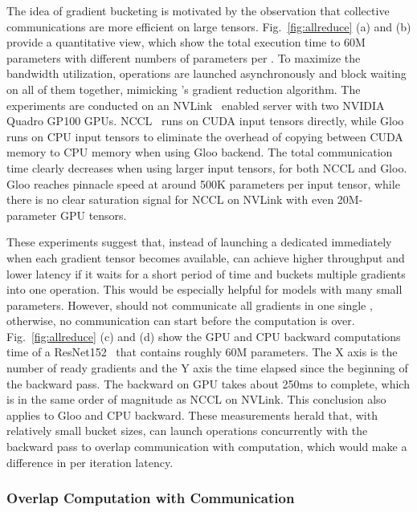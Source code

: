 The idea of gradient bucketing is motivated by the observation that collective communications are more efficient on large tensors. Fig.~\ref{fig:allreduce} (a) and (b) provide a quantitative view, which show the total execution time to  60M  parameters with different numbers of parameters per . To maximize the bandwidth utilization,  operations are launched asynchronously and block waiting on all of them together, mimicking 's gradient reduction algorithm. The experiments are conducted on an NVLink~\cite{nvlink} enabled server with two NVIDIA Quadro GP100 GPUs. NCCL~\cite{nccl}  runs on CUDA input tensors directly, while Gloo~\cite{gloo}  runs on CPU input tensors to eliminate the overhead of copying between CUDA memory to CPU memory when using Gloo backend. The total communication time clearly decreases when using larger input tensors, for both NCCL and Gloo. Gloo reaches pinnacle speed at around 500K parameters per input tensor, while there is no clear saturation signal for NCCL on NVLink with even 20M-parameter GPU tensors. 

These experiments suggest that, instead of launching a dedicated  immediately when each gradient tensor becomes available,  can achieve higher throughput and lower latency if it waits for a short period of time and buckets multiple gradients into one  operation. This would be especially helpful for models with many small parameters. However,  should not communicate all gradients in one single , otherwise, no communication can start before the computation is over. Fig.~\ref{fig:allreduce} (c) and (d) show the GPU and CPU backward computations time of a ResNet152~\cite{resnet} that contains roughly 60M parameters. The X axis is the number of ready gradients and the Y axis the time elapsed since the beginning of the backward pass. The backward on GPU takes about 250ms to complete, which is in the same order of magnitude as NCCL on NVLink. This conclusion also applies to Gloo and CPU backward. These measurements herald that, with relatively small bucket sizes,  can launch  operations concurrently with the backward pass to overlap communication with computation, which would make a difference in per iteration latency. 

\subsubsection{Overlap Computation with Communication}\label{sec:overlap}

